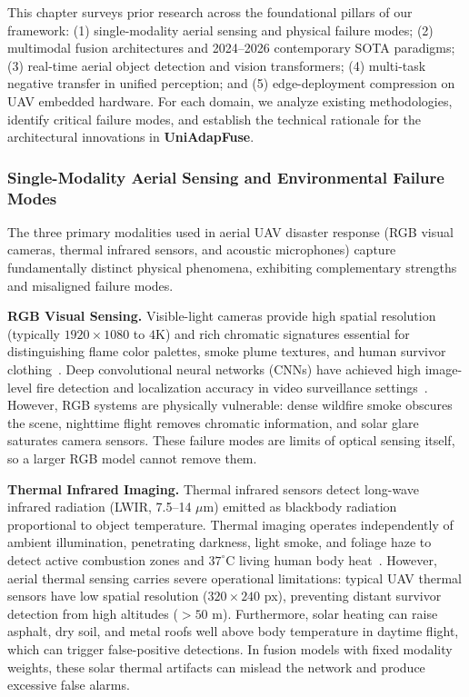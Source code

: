 \documentclass[journal]{IEEEtran}
\begin{document}
This chapter surveys prior research across the foundational pillars of our framework: (1) single-modality aerial sensing and physical failure modes; (2) multimodal fusion architectures and 2024--2026 contemporary SOTA paradigms; (3) real-time aerial object detection and vision transformers; (4) multi-task negative transfer in unified perception; and (5) edge-deployment compression on UAV embedded hardware. For each domain, we analyze existing methodologies, identify critical failure modes, and establish the technical rationale for the architectural innovations in \textbf{UniAdapFuse}.

\subsubsection{Single-Modality Aerial Sensing and Environmental Failure Modes}

The three primary modalities used in aerial UAV disaster response (RGB visual cameras, thermal infrared sensors, and acoustic microphones) capture fundamentally distinct physical phenomena, exhibiting complementary strengths and misaligned failure modes.

\textbf{RGB Visual Sensing.}
Visible-light cameras provide high spatial resolution (typically $1920\times1080$ to $4\text{K}$) and rich chromatic signatures essential for distinguishing flame color palettes, smoke plume textures, and human survivor clothing~\cite{celik2009fire, toreyin2006computer}. Deep convolutional neural networks (CNNs) have achieved high image-level fire detection and localization accuracy in video surveillance settings~\cite{muhammad2019efficient}. However, RGB systems are physically vulnerable: dense wildfire smoke obscures the scene, nighttime flight removes chromatic information, and solar glare saturates camera sensors. These failure modes are limits of optical sensing itself, so a larger RGB model cannot remove them.

\textbf{Thermal Infrared Imaging.}
Thermal infrared sensors detect long-wave infrared radiation (LWIR, 7.5--14 $\mu$m) emitted as blackbody radiation proportional to object temperature. Thermal imaging operates independently of ambient illumination, penetrating darkness, light smoke, and foliage haze to detect active combustion zones and $37^\circ\text{C}$ living human body heat~\cite{toulouse2017computer}. However, aerial thermal sensing carries severe operational limitations: typical UAV thermal sensors have low spatial resolution ($320\times240$ px), preventing distant survivor detection from high altitudes ($>50$ m). Furthermore, solar heating can raise asphalt, dry soil, and metal roofs well above body temperature in daytime flight, which can trigger false-positive detections. In fusion models with fixed modality weights, these solar thermal artifacts can mislead the network and produce excessive false alarms.
\end{document}
